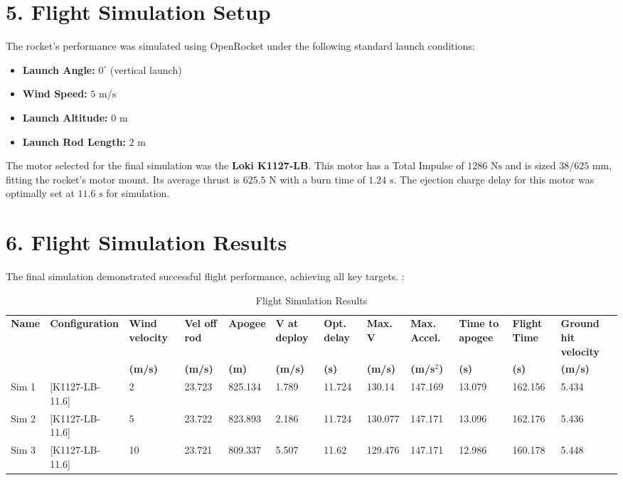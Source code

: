 \documentclass[12pt, a4paper]{article}
\begin{document}
\section*{5. Flight Simulation Setup}
The rocket's performance was simulated using OpenRocket under the following standard launch conditions:
\begin{itemize}
    \item \textbf{Launch Angle:} $0^\circ$ (vertical launch)
    \item \textbf{Wind Speed:} $5 \text{ m/s}$
    \item \textbf{Launch Altitude:} $0 \text{ m}$
    \item \textbf{Launch Rod Length:} $2 \text{ m}$
\end{itemize}
The motor selected for the final simulation was the \textbf{Loki K1127-LB}. This motor has a Total Impulse of $1286 \text{ Ns}$ and is sized $38/625 \text{ mm}$, fitting the rocket's motor mount. Its average thrust is $625.5 \text{ N}$ with a burn time of $1.24 \text{ s}$. The ejection charge delay for this motor was optimally set at $11.6 \text{ s}$ for simulation.

\section*{6. Flight Simulation Results}
The final simulation demonstrated successful flight performance, achieving all key targets. :

\begingroup
\setlength{\tabcolsep}{1pt} %
\small %
\begin{longtable}{|l|l|p{1.2cm}|p{1.2cm}|p{1.4cm}|p{1.2cm}|p{1.2cm}|p{1.2cm}|p{1.3cm}|p{1.3cm}|p{1.3cm}|p{1.5cm}|}
    \caption{Flight Simulation Results} \\
    \toprule
    \textbf{Name} & \textbf{Configuration} & \textbf{Wind velocity} & \textbf{Vel off rod} & \textbf{Apogee} & \textbf{V at deploy} & \textbf{Opt. delay} & \textbf{Max. V} & \textbf{Max. Accel.} & \textbf{Time to apogee} & \textbf{Flight Time} & \textbf{Ground hit velocity} \\
    & & \textbf{(m/s)} & \textbf{(m/s)} & \textbf{(m)} & \textbf{(m/s)} & \textbf{(s)} & \textbf{(m/s)} & \textbf{(m/s$^2$)} & \textbf{(s)} & \textbf{(s)} & \textbf{(m/s)} \\
    \midrule
    \endhead
    Sim 1 & [K1127-LB-11.6] & 2 & 23.723 & 825.134 & 1.789 & 11.724 & 130.14 & 147.169 & 13.079 & 162.156 & 5.434 \\
    Sim 2 & [K1127-LB-11.6] & 5 & 23.722 & 823.893 & 2.186 & 11.724 & 130.077 & 147.171 & 13.096 & 162.176 & 5.436 \\
    Sim 3 & [K1127-LB-11.6] & 10 & 23.721 & 809.337 & 5.507 & 11.62 & 129.476 & 147.171 & 12.986 & 160.178 & 5.448 \\
    \bottomrule
\end{longtable}
\endgroup
\end{document}
